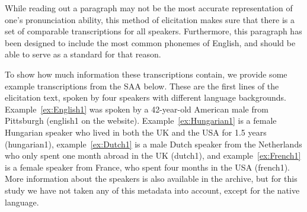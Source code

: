 \documentclass[output=paper]{LSP/langsci}
\begin{document}
While reading out a paragraph may not be the most accurate representation of one's pronunciation ability, this method of elicitation makes sure that there is a set of comparable transcriptions for all speakers. Furthermore, this paragraph has been designed to include the most common phonemes of English, and should be able to serve as a standard for that reason.

To show how much information these transcriptions contain, we provide some example transcriptions from the SAA below. These are the first lines of the elicitation text, spoken by four speakers with different language backgrounds. Example~\ref{ex:English1} was spoken by a 42-year-old American male from Pittsburgh (english1 on the website). Example~\ref{ex:Hungarian1} is a female Hungarian speaker who lived in both the UK and the USA for 1.5 years (hungarian1), example~\ref{ex:Dutch1} is a male Dutch speaker from the Netherlands who only spent one month abroad in the UK (dutch1), and example~\ref{ex:French1} is a female speaker from France, who spent four months in the USA (french1). More information about the speakers is also available in the archive, but for this study we have not taken any of this metadata into account, except for the native language.

\end{document}
